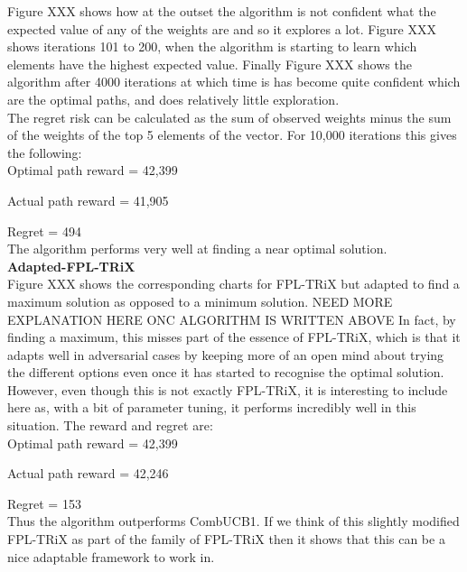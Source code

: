 Figure XXX shows how at the outset the algorithm is not confident what the expected value of any of the weights are and so it explores a lot. Figure XXX shows iterations 101 to 200, when the algorithm is starting to learn which elements have the highest expected value. Finally Figure XXX shows the algorithm after 4000 iterations at which time is has become quite confident which are the optimal paths, and does relatively little exploration.\\

The regret risk can be calculated as the sum of observed weights minus the sum of the weights of the top 5 elements of the vector. For 10,000 iterations this gives the following:\\

Optimal path reward = 42,399

Actual path reward = 41,905

Regret = 494\\

The algorithm performs very well at finding a near optimal solution.\\

\noindent \textbf{Adapted-FPL-TRiX}\\

Figure XXX shows the corresponding charts for FPL-TRiX but adapted to find a maximum solution as opposed to a minimum solution. NEED MORE EXPLANATION HERE ONC ALGORITHM IS WRITTEN ABOVE In fact, by finding a maximum, this misses part of the essence of FPL-TRiX, which is that it adapts well in adversarial cases by keeping more of an open mind about trying the different options even once it has started to recognise the optimal solution. However, even though this is not exactly FPL-TRiX, it is interesting to include here as, with a bit of parameter tuning, it performs incredibly well in this situation. The reward and regret are:\\

Optimal path reward = 42,399

Actual path reward = 42,246

Regret = 153\\

Thus the algorithm outperforms CombUCB1. If we think of this slightly modified FPL-TRiX as part of the family of FPL-TRiX then it shows that this can be a nice adaptable framework to work in.\\


